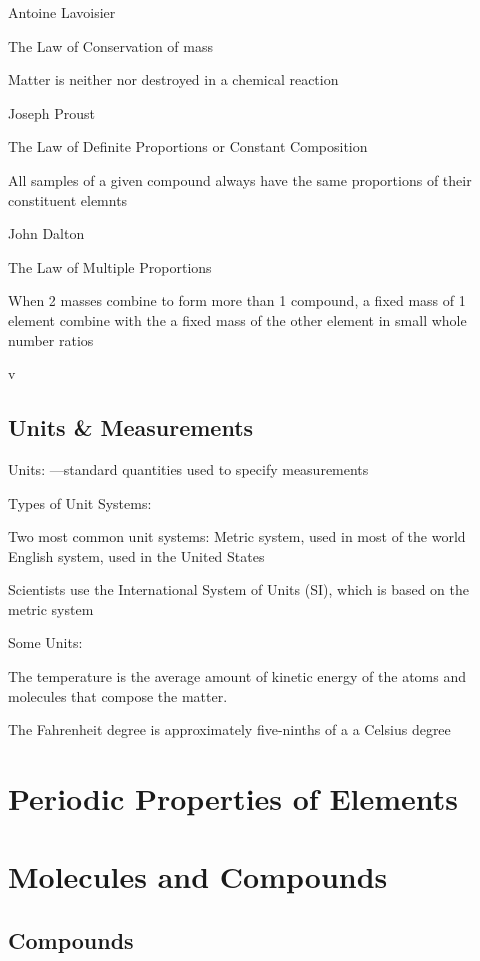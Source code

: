 \documentclass[openany]{book}
\begin{document}
Antoine Lavoisier

The Law of Conservation of mass

Matter is neither nor destroyed in a chemical reaction

Joseph Proust

The Law of Definite Proportions or Constant Composition

All samples of a given compound always have the same proportions of their constituent elemnts

John Dalton

The Law of Multiple Proportions

When 2 masses combine to form more than 1 compound, a fixed mass of 1 element combine with the a fixed mass of the other element in small whole number ratios

v

\section{Units \& Measurements}

Units: 
—standard quantities used to specify
measurements


Types of Unit Systems:

Two most common unit systems:
Metric system, used in most of the world
English system, used in the United States

Scientists use the International System of Units (SI),
which is based on the metric system

Some Units:

The temperature is the average amount of kinetic energy of the atoms and molecules that compose the matter.

The Fahrenheit degree is approximately five-ninths of a a Celsius degree

\chapter{Periodic Properties of Elements}

\chapter{Molecules and Compounds}



\section{Compounds}
\end{document}
